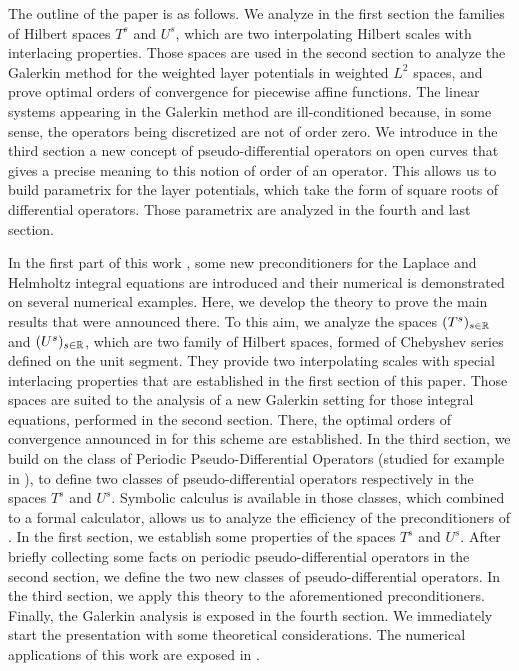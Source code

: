 \documentclass[a4paper]{article}
\begin{document}
The outline of the paper is as follows. We analyze in the first section the families of Hilbert spaces $T^s$ and $U^s$, which are two interpolating Hilbert scales with interlacing properties. Those spaces are used in the second section to analyze the Galerkin method for the weighted layer potentials in weighted $L^2$ spaces, and prove optimal orders of convergence for piecewise affine functions. 
The linear systems appearing in the Galerkin method are ill-conditioned because, in some sense, the operators being discretized are not of order zero. We introduce in the third section a new concept of pseudo-differential operators on open curves that gives a precise meaning to this notion of order of an operator. This allows us to build parametrix for the layer potentials, which take the form of square roots of differential operators. Those parametrix are analyzed in the fourth and last section.


In the first part of this work \cite{alouges2018new}, some new preconditioners for the Laplace and Helmholtz integral equations are introduced and their numerical is demonstrated on several numerical examples. Here, we develop the theory to prove the main results that were announced there. To this aim, we analyze the spaces $(T^s)_{s\in \mathbb{R}}$ and $(U^s)_{s \in \mathbb{R}}$, which are two family of Hilbert spaces, formed of Chebyshev series defined on the unit segment. They provide two interpolating scales with special interlacing properties that are established in the first section of this paper. Those spaces are suited to the analysis of a new Galerkin setting for those integral equations, performed in the second section. There, the optimal orders of convergence announced in \cite{alouges2018new} for this scheme are established.  In the third section, we build on the class of Periodic Pseudo-Differential Operators (studied for example in \cite{thrunen1998symbol}), to define two classes of pseudo-differential operators respectively in the spaces $T^s$ and $U^s$. Symbolic calculus is available in those classes, which combined to a formal calculator, allows us to analyze the efficiency of the preconditioners of \cite{alouges2018new}.
In the first section, we establish some properties of the spaces $T^s$ and $U^s$. After briefly collecting some facts on periodic pseudo-differential operators in the second section, we define the two new classes of pseudo-differential operators. In the third section, we apply this theory to the aforementioned preconditioners. Finally, the Galerkin analysis is exposed in the fourth section. 
We immediately start the presentation with some theoretical considerations. The numerical applications of this work are exposed in \cite{alouges2018new}. 
 
\end{document}
